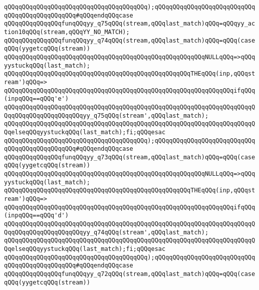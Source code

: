 \verb|qQQqqQQqqQQqqQQqqQQqqQQqqQQqqQQqqQQqqQQq);qQQqqQQqqQQqqQQqqQQqqQQqqQQqqQQqqQQqqQQqqQQqqQQq#qQQqendqQQqcase|\newline
\verb|qQQqqQQqqQQqqQQqfunqQQqyy_q75qQQq(stream,qQQqlast_match)qQQq=qQQqyy_action10qQQq(stream,qQQqYY_NO_MATCH);|\newline
\verb|qQQqqQQqqQQqqQQqfunqQQqyy_q74qQQq(stream,qQQqlast_match)qQQq=qQQq(caseqQQq(yygetcqQQq(stream))|\newline
\verb|qQQqqQQqqQQqqQQqqQQqqQQqqQQqqQQqqQQqqQQqqQQqqQQqqQQqqQQqNULLqQQq=>qQQqyystuckqQQq(last_match);|\newline
\verb|qQQqqQQqqQQqqQQqqQQqqQQqqQQqqQQqqQQqqQQqqQQqqQQqqQQqTHEqQQq(inp,qQQqstream')qQQq=>|\newline
\verb|qQQqqQQqqQQqqQQqqQQqqQQqqQQqqQQqqQQqqQQqqQQqqQQqqQQqqQQqqQQqqQQqifqQQq(inpqQQq==qQQq'e')|\newline
\verb|qQQqqQQqqQQqqQQqqQQqqQQqqQQqqQQqqQQqqQQqqQQqqQQqqQQqqQQqqQQqqQQqqQQqqQQqqQQqqQQqqQQqqQQqqQQqyy_q75qQQq(stream',qQQqlast_match);|\newline
\verb|qQQqqQQqqQQqqQQqqQQqqQQqqQQqqQQqqQQqqQQqqQQqqQQqqQQqqQQqqQQqqQQqqQQqqQQqelseqQQqyystuckqQQq(last_match);fi;qQQqesac|\newline
\verb|qQQqqQQqqQQqqQQqqQQqqQQqqQQqqQQqqQQqqQQq);qQQqqQQqqQQqqQQqqQQqqQQqqQQqqQQqqQQqqQQqqQQqqQQq#qQQqendqQQqcase|\newline
\verb|qQQqqQQqqQQqqQQqfunqQQqyy_q73qQQq(stream,qQQqlast_match)qQQq=qQQq(caseqQQq(yygetcqQQq(stream))|\newline
\verb|qQQqqQQqqQQqqQQqqQQqqQQqqQQqqQQqqQQqqQQqqQQqqQQqqQQqqQQqNULLqQQq=>qQQqyystuckqQQq(last_match);|\newline
\verb|qQQqqQQqqQQqqQQqqQQqqQQqqQQqqQQqqQQqqQQqqQQqqQQqqQQqTHEqQQq(inp,qQQqstream')qQQq=>|\newline
\verb|qQQqqQQqqQQqqQQqqQQqqQQqqQQqqQQqqQQqqQQqqQQqqQQqqQQqqQQqqQQqqQQqifqQQq(inpqQQq==qQQq'd')|\newline
\verb|qQQqqQQqqQQqqQQqqQQqqQQqqQQqqQQqqQQqqQQqqQQqqQQqqQQqqQQqqQQqqQQqqQQqqQQqqQQqqQQqqQQqqQQqqQQqyy_q74qQQq(stream',qQQqlast_match);|\newline
\verb|qQQqqQQqqQQqqQQqqQQqqQQqqQQqqQQqqQQqqQQqqQQqqQQqqQQqqQQqqQQqqQQqqQQqqQQqelseqQQqyystuckqQQq(last_match);fi;qQQqesac|\newline
\verb|qQQqqQQqqQQqqQQqqQQqqQQqqQQqqQQqqQQqqQQq);qQQqqQQqqQQqqQQqqQQqqQQqqQQqqQQqqQQqqQQqqQQqqQQq#qQQqendqQQqcase|\newline
\verb|qQQqqQQqqQQqqQQqfunqQQqyy_q72qQQq(stream,qQQqlast_match)qQQq=qQQq(caseqQQq(yygetcqQQq(stream))|\newline
